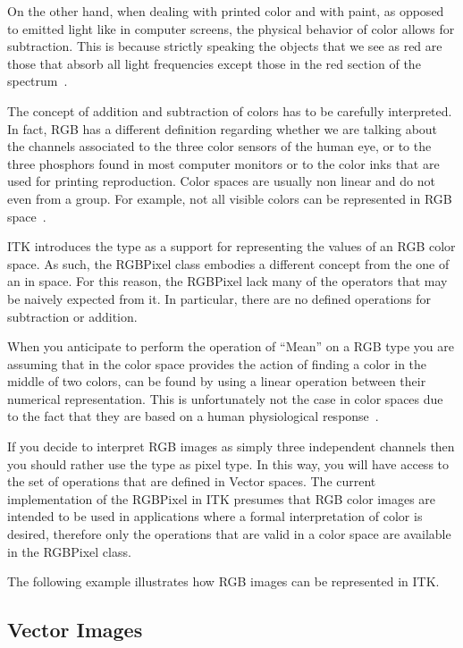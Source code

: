 On the other hand, when dealing with printed color and with paint, as opposed
to emitted light like in computer screens, the physical behavior of color
allows for subtraction. This is because strictly speaking the objects that we
see as red are those that absorb all light frequencies except those in the red
section of the spectrum~\cite{Wyszecki2000}.

The concept of addition and subtraction of colors has to be carefully
interpreted. In fact, RGB has a different definition regarding whether we are
talking about the channels associated to the three color sensors of the human
eye, or to the three phosphors found in most computer monitors or to the color
inks that are used for printing reproduction. Color spaces are usually non
linear and do not even from a group. For example, not all visible colors can be
represented in RGB space~\cite{Wyszecki2000}.

ITK introduces the  type as a support for representing the
values of an RGB color space. As such, the RGBPixel class embodies a different
concept from the one of an  in space. For this reason, the
RGBPixel lack many of the operators that may be naively expected from it. In
particular, there are no defined operations for subtraction or addition.

When you anticipate to perform the operation of ``Mean'' on a RGB type you are
assuming that in the color space provides the action of finding a color in the
middle of two colors, can be found by using a linear operation between their
numerical representation. This is unfortunately not the case in  color spaces
due to the fact that they are based on a human physiological
response~\cite{Malacara2002}.

If you decide to interpret RGB images as simply three independent channels then
you should rather use the  type as pixel type. In this way, you
will have access to the set of operations that are defined in Vector spaces.
The current implementation of the RGBPixel in ITK presumes that RGB color
images are intended to be used in applications where a formal interpretation of
color is desired, therefore only the operations that are valid in a color space
are available in the RGBPixel class.

The following example illustrates how RGB images can be represented in ITK.

\label{sec:DefiningRGBImages}



\subsection{Vector Images}
\label{sec:DefiningVectorImages}

